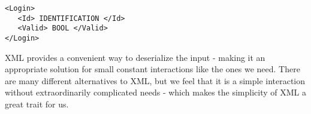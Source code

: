 \begin{lstlisting}
<Login>
   <Id> IDENTIFICATION </Id>
   <Valid> BOOL </Valid>
</Login>
\end{lstlisting}

XML provides a convenient way to deserialize the input - making it an appropriate solution for small constant interactions like the ones we need. There are many different alternatives to XML, but we feel that it is a simple interaction without extraordinarily complicated needs - which makes the simplicity of XML a great trait for us.





